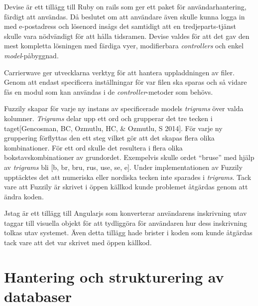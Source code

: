 Devise är ett tillägg till Ruby on rails som ger ett paket för
användarhantering, färdigt att användas. Då beslutet om att användare även
skulle kunna logga in med e-postadress och lösenord insågs det samtidigt att en
tredjeparts-tjänst skulle vara nödvändigt för att hålla tidsramen. Devise valdes
för att det gav den mest kompletta lösningen med färdiga vyer, modifierbara
\emph{controllers} och enkel \emph{model}-påbyggnad.

Carrierwave ger utvecklarna verktyg för att hantera uppladdningen av filer.
Genom att endast specificera inställningar för var filen ska sparas och så
vidare fås en modul som kan användas i de \emph{controller}-metoder som behövs.

Fuzzily skapar för varje ny instans av specificerade models \emph{trigrams} över valda
kolumner. \emph{Trigrams} delar upp ett ord och grupperar det tre tecken i
taget[Gencosman, BC, Ozmutlu, HC, \& Ozmutlu, S 2014]. För varje ny gruppering
förflyttas den ett steg vilket gör att det skapas flera olika kombinationer. För
ett ord skulle det resultera i flera olika bokstavskombinationer av grundordet.
Exempelvis skulle ordet “bruse” med hjälp av \emph{trigrams} bli [b, br, bru, rus, use,
se, e]. Under implementationen av Fuzzily upptäcktes det att numeriska eller
nordiska tecken inte sparades i \emph{trigrams}. Tack vare att Fuzzily är skrivet i
öppen källkod kunde problemet åtgärdas genom att ändra koden.

Jstag är ett tillägg till Angularjs som konverterar användarens inskrivning utav
taggar till visuella objekt för att tydliggöra för användaren hur dess
inskrivning tolkas utav systemet. Även detta tillägg hade brister i koden som
kunde åtgärdas tack vare att det var skrivet med öppen källkod.

\section{Hantering och strukturering av databaser}

